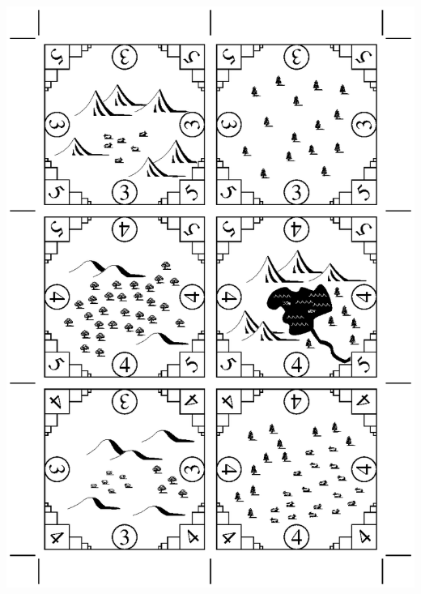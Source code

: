 \documentclass[12pt]{article}
\begin{document}
\begin{center}
\includegraphics[width=7in]{tile_sheet_4.eps}

\vfill

\newpage

~\vfill


\end{center}
\end{document}
